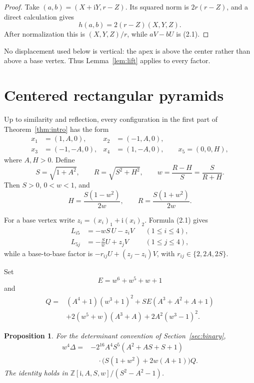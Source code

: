 \documentclass[11pt]{amsart}
\newtheorem{proposition}[theorem]{Proposition}
\theoremstyle{definition}
\newcommand{\ii}{\mathrm{i}}
\newcommand{\DeltaA}{\mathit{\Delta}}
\begin{document}
\begin{proof}
Take $(a,b)=(X+\ii Y,r-Z)$. Its squared norm is $2r(r-Z)$, and a direct
calculation gives
\[
h(a,b)=2(r-Z)(X,Y,Z).
\]
After normalization this is $(X,Y,Z)/r$, while $aV-bU$ is (2.1).
\end{proof}

No displacement used below is vertical: the apex is above the center rather
than above a base vertex. Thus Lemma~\ref{lem:lift} applies to every factor.

\section{Centered rectangular pyramids}\label{sec:rectangle}

Up to similarity and reflection, every configuration in the first part of
Theorem~\ref{thm:intro} has the form
\begin{equation}\label{eq:rectangle-points}
\begin{aligned}
x_1&=(1,A,0),&x_2&=(-1,A,0),\\
x_3&=(-1,-A,0),&x_4&=(1,-A,0),\qquad x_5=(0,0,H),
\end{aligned}
\end{equation}
where $A,H>0$. Define
\[
S=\sqrt{1+A^2},\qquad R=\sqrt{S^2+H^2},\qquad
w=\frac{R-H}{S}=\frac{S}{R+H}.
\]
Then $S>0$, $0<w<1$, and
\begin{equation}\label{eq:w-inverse}
H=\frac{S(1-w^2)}{2w},\qquad R=\frac{S(1+w^2)}{2w}.
\end{equation}

For a base vertex write $z_i=(x_i)_1+\ii(x_i)_2$. Formula (2.1) gives
\begin{align*}
L_{i5}&=-wS\,U-z_iV &&(1\leq i\leq4),\\
L_{5j}&=-\frac{S}{w}U+z_jV &&(1\leq j\leq4),
\end{align*}
while a base-to-base factor is
$-r_{ij}U+(z_j-z_i)V$, with $r_{ij}\in\{2,2A,2S\}$.

Set
\[
E=w^6+w^5+w+1
\]
and
\begin{equation}\label{eq:rectangle-Q}
\begin{split}
Q={}&(A^4+1)(w^3+1)^2
 +SE(A^3+A^2+A+1)\\
 &+2(w^5+w)(A^3+A)+2A^2(w^3-1)^2.
\end{split}
\end{equation}

\begin{proposition}\label{prop:rectangle-factor}
For the determinant convention of Section~\ref{sec:binary},
\begin{equation}\label{eq:rectangle-factor}
\begin{split}
w^4\DeltaA={}&-2^{16}A^4S^5(A^2+AS+S+1)\\
&\quad\cdot\bigl(S(1+w^2)+2w(A+1)\bigr)Q.
\end{split}
\end{equation}
The identity holds in
$\mathbb Z[\ii,A,S,w]/(S^2-A^2-1)$.
\end{proposition}
\end{document}
